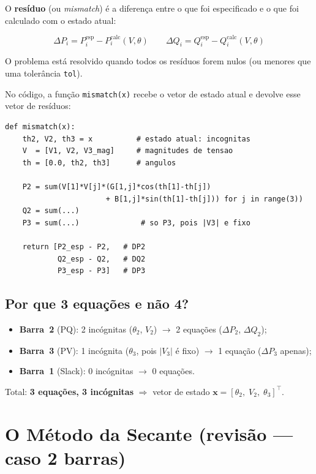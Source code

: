 \documentclass[
  12pt,
  a4paper,
  oneside,
  brazil
]{abntex2}
\begin{document}
O \textbf{resíduo} (ou \emph{mismatch}) é a diferença entre o que foi
especificado e o que foi calculado com o estado atual:

\begin{equation}
  \Delta P_i = P_i^{\text{esp}} - P_i^{\text{calc}}(V,\theta)
  \qquad
  \Delta Q_i = Q_i^{\text{esp}} - Q_i^{\text{calc}}(V,\theta)
\end{equation}

O problema está resolvido quando todos os resíduos forem nulos (ou menores
que uma tolerância \texttt{tol}).

No código, a função \texttt{mismatch(x)} recebe o vetor de estado atual e
devolve esse vetor de resíduos:

\begin{lstlisting}
def mismatch(x):
    th2, V2, th3 = x          # estado atual: incognitas
    V  = [V1, V2, V3_mag]     # magnitudes de tensao
    th = [0.0, th2, th3]      # angulos

    P2 = sum(V[1]*V[j]*(G[1,j]*cos(th[1]-th[j])
                       + B[1,j]*sin(th[1]-th[j])) for j in range(3))
    Q2 = sum(...)
    P3 = sum(...)              # so P3, pois |V3| e fixo

    return [P2_esp - P2,   # DP2
            Q2_esp - Q2,   # DQ2
            P3_esp - P3]   # DP3
\end{lstlisting}

\section{Por que 3 equações e não 4?}

\begin{itemize}
  \item \textbf{Barra~2} (PQ): 2 incógnitas ($\theta_2$, $V_2$)
        $\rightarrow$ 2 equações ($\Delta P_2$, $\Delta Q_2$);
  \item \textbf{Barra~3} (PV): 1 incógnita ($\theta_3$, pois $|V_3|$ é fixo)
        $\rightarrow$ 1 equação ($\Delta P_3$ apenas);
  \item \textbf{Barra~1} (Slack): 0 incógnitas $\rightarrow$ 0 equações.
\end{itemize}

Total: \textbf{3 equações, 3 incógnitas} $\Rightarrow$
vetor de estado $\mathbf{x} = [\theta_2,\; V_2,\; \theta_3]^\top$.

\chapter{O Método da Secante (revisão — caso 2 barras)}
\end{document}
